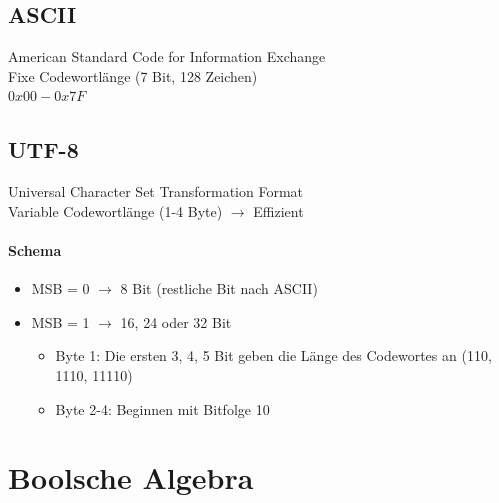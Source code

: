 \documentclass[6pt,a4paper]{scrartcl}
\begin{document}
\begin{multicols*}{3}
	\subsection{ASCII}
	American Standard Code for Information Exchange \\
	Fixe Codewortlänge (7 Bit, 128 Zeichen)\\
	$0x00 - 0x7F$
	\subsection{UTF-8}
	Universal Character Set Transformation Format \\
	Variable Codewortlänge (1-4 Byte) $\rightarrow$ Effizient \\
	\paragraph{Schema}	
	\begin{itemize}
	\item MSB = 0 $\rightarrow$ 8 Bit (restliche Bit nach ASCII)
	\item MSB = 1 $\rightarrow$ 16, 24 oder 32 Bit 
	 \begin{itemize}
	
	\item Byte 1: Die ersten 3, 4, 5 Bit geben die Länge des Codewortes an (110, 1110, 11110)
	\item Byte 2-4: Beginnen mit Bitfolge 10
	\end{itemize}
	\end{itemize}
	
\section{Boolsche Algebra}


\end{multicols*}
\end{document}
